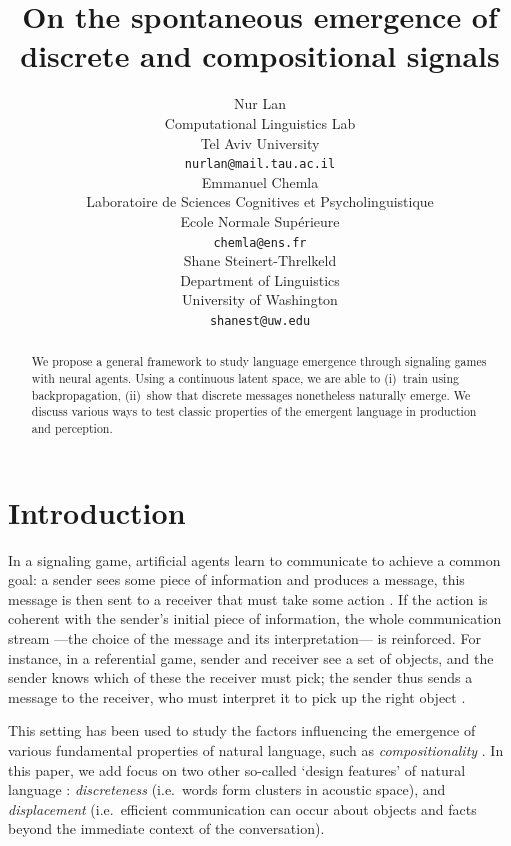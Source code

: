 \documentclass[11pt,a4paper]{article}
\title{On the spontaneous emergence of discrete and compositional signals}
\author{Nur Lan \\
  Computational Linguistics Lab \\
  Tel Aviv University \\
  \texttt{nurlan@mail.tau.ac.il} \\\And
  Emmanuel Chemla \\
  Laboratoire de Sciences Cognitives et Psycholinguistique \\
  Ecole Normale Sup\'erieure \\
  \texttt{chemla@ens.fr} \\\And
  Shane Steinert-Threlkeld \\
  Department of Linguistics \\
  University of Washington \\
  \texttt{shanest@uw.edu}
  }
\date{}
\begin{document}
\maketitle

\begin{abstract}
	We propose a general framework to study language emergence through signaling games with neural agents. Using a continuous latent space, we are able to (i)~train using backpropagation, (ii)~show that discrete messages nonetheless naturally emerge. We discuss various ways to test classic properties of the emergent language in production and perception.
\end{abstract}

\section{Introduction}

In a signaling game, artificial agents learn to communicate to achieve a common goal: a sender sees some piece of information and produces a message, this message is then sent to a receiver that must take some action \citep{Lewis1969, Skyrms2010}. If the action is coherent with the sender's initial piece of information, the whole communication stream ---the choice of the message and its interpretation--- is reinforced. 
For instance, in a referential game, sender and receiver see a set of objects, and the sender knows which of these the receiver must pick; the sender thus sends a message to the receiver, who must interpret it to pick up the right object \citep{Lazaridou2017, Lazaridou2018, Havrylov2017, Chaabouni2019a}.

This setting has been used to study the factors influencing the emergence of various fundamental properties of natural language, such as \emph{compositionality} \citep{Kirby2015, Franke2016, SteinertThrelkeld2016, Mordatch2018, Lazaridou2018, Choi2018}.
In this paper, we add focus on two other so-called `design features' of natural language \citep{Hockett1960}: 
\emph{discreteness} (i.e.~words form clusters in acoustic space), 
and \emph{displacement} (i.e.~efficient communication can occur about objects and facts beyond the immediate context of the conversation).
\end{document}
